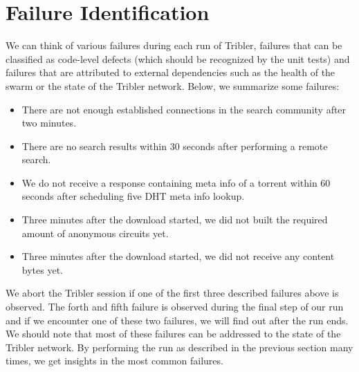 \section{Failure Identification}
We can think of various failures during each run of Tribler, failures that can be classified as code-level defects (which should be recognized by the unit tests) and failures that are attributed to external dependencies such as the health of the swarm or the state of the Tribler network. Below, we summarize some failures:
\begin{itemize}
	\item There are not enough established connections in the search community after two minutes.
	\item There are no search results within 30 seconds after performing a remote search.
	\item We do not receive a response containing meta info of a torrent within 60 seconds after scheduling five DHT meta info lookup.
	\item Three minutes after the download started, we did not built the required amount of anonymous circuits yet.
	\item Three minutes after the download started, we did not receive any content bytes yet.
\end{itemize}
We abort the Tribler session if one of the first three described failures above is observed. The forth and fifth failure is observed during the final step of our run and if we encounter one of these two failures, we will find out after the run ends. We should note that most of these failures can be addressed to the state of the Tribler network. By performing the run as described in the previous section many times, we get insights in the most common failures.



